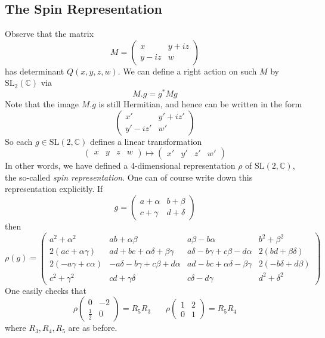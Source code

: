 \documentclass[]{article}
\begin{document}
\subsection*{The Spin Representation}

Observe that the matrix
$$
M =
\begin{pmatrix}
x & y + iz \\
y - iz & w
\end{pmatrix}
$$
has determinant $Q(x, y, z, w)$.
We can define a right action on such $M$ by $\text{SL}_2(\mathbb{C})$ via
$$
M.g = g^*Mg
$$
Note that the image $M.g$ is still Hermitian, and hence can be written in the form
$$
\begin{pmatrix}
x' & y' + iz' \\
y' - iz' & w'
\end{pmatrix}
$$
So each $g \in \text{SL}(2, \mathbb{C})$ defines a linear transformation
$$
\begin{pmatrix}
x & y & z & w
\end{pmatrix} \mapsto
\begin{pmatrix}
x' & y' & z' & w'
\end{pmatrix}
$$
In other words, we have defined a 4-dimensional representation $\rho$ of $\text{SL}(2, \mathbb{C})$, the so-called \textit{spin representation}.
One can of course write down this representation explicitly.
If
$$
g = 
\begin{pmatrix}
a + \alpha & b + \beta \\
c + \gamma & d + \delta
\end{pmatrix}
$$
then
$$
\rho(g) =
\begin{pmatrix}
a^2 + \alpha^2 & ab + \alpha\beta & a\beta - b\alpha & b^2 + \beta^2 \\
2(ac + \alpha\gamma) & ad + bc + \alpha\delta + \beta\gamma & a\delta - b\gamma + c\beta - d\alpha & 2(bd + \beta\delta) \\
2(-a\gamma + c\alpha) & -a\delta - b\gamma + c\beta + d\alpha & ad - bc + \alpha\delta - \beta\gamma & 2(-b\delta + d\beta) \\
c^2 + \gamma^2 & cd + \gamma\delta & c\delta - d\gamma & d^2 + \delta^2
\end{pmatrix}
$$
One easily checks that
$$
\rho
\begin{pmatrix}
0 & -2 \\
\frac{1}{2} & 0
\end{pmatrix} = R_5R_3 ~~~~~~~~
\rho
\begin{pmatrix}
1 & 2 \\
0 & 1
\end{pmatrix} = R_5R_4
$$
where $R_3, R_4, R_5$ are as before.
\\
\end{document}
